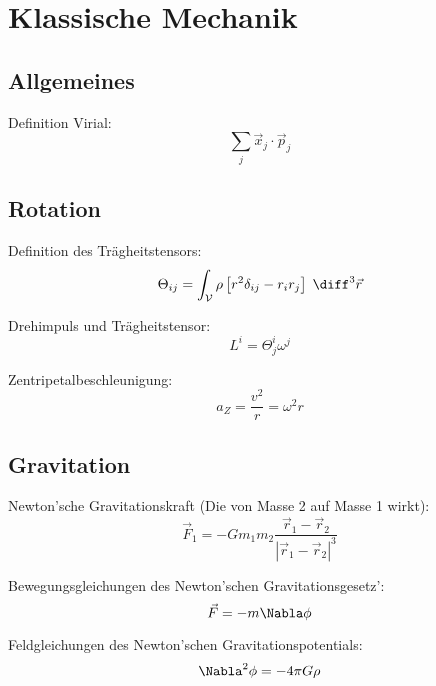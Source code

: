 \documentclass[11pt]{article}
\numberwithin{equation}{section}
\begin{document}
      \newpage
    \section{Klassische Mechanik}

      \subsection{Allgemeines}
        Definition Virial:
        \begin{equation}
          \sum_j \vec{x}_j\cdot\vec{p}_j
        \end{equation}

      \subsection{Rotation}
        Definition des Trägheitstensors:
        \begin{equation}
          \Theta_{ij}=\int_{\mathcal{V}} \rho \left[r^2\delta_{ij}-r_i r_j\right] \;\diff^3\vec{r}
        \end{equation}

        Drehimpuls und Trägheitstensor:
        \begin{equation}
          L^i = \Theta^i_j \omega^j
        \end{equation}

        Zentripetalbeschleunigung:
        \begin{equation}
          a_Z = \frac{v^2}{r} = \omega^2 r
        \end{equation}

      \subsection{Gravitation}
        Newton'sche Gravitationskraft (Die von Masse 2 auf Masse 1 wirkt):
        \begin{equation}
          \vec{F}_1 = - G m_1 m_2 \frac{\vec{r}_1-\vec{r}_2}{\left|\vec{r}_1-\vec{r}_2\right|^3}
        \end{equation}

        Bewegungsgleichungen des Newton'schen Gravitationsgesetz':
        \begin{equation}
          \vec{F}=-m\Nabla\phi
        \end{equation}

        Feldgleichungen des Newton'schen Gravitationspotentials:
        \begin{equation}
          \Nabla^2\phi=-4\pi G\rho
        \end{equation}
\end{document}
